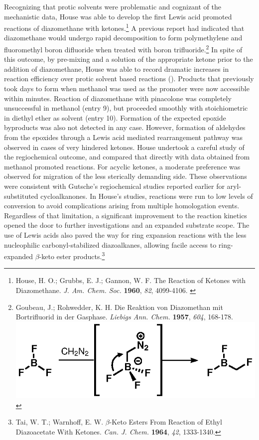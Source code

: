 Recognizing that protic solvents were problematic and cognizant of the mechanistic data, House was
able to develop the first Lewis acid promoted reactions of diazomethane with
ketones.\footnote{{\frenchspacing House, H. O.; Grubbs, E. J.; Gannon, W. F. The Reaction of Ketones
with Diazomethane. \textit{J. Am. Chem. Soc.} \textbf{1960}, \textit{82}, 4099-4106.}
\label{ref:house}} A previous report had indicated that diazomethane would undergo rapid
decomposition to form polymethylene and fluoromethyl boron difluoride when treated with boron trifluoride.\footnote{{\frenchspacing Goubeau,
J.; Rohwedder, K. H. Die Reaktion von Diazomethan mit Bortrifluorid in der Gasphase. \textit{Liebigs Ann. Chem.} \textbf{1957}, \textit{604},
168-178.} \\ \includegraphics[scale=0.7]{chp_diazobkg/images/rohwedder}} In spite of this outcome,
by pre-mixing  and a solution of the appropriate ketone prior to the addition of
diazomethane, House was able to record dramatic increases in reaction efficiency over protic
solvent based reactions (). Products that previously took days to form when
methanol was used as the promoter were now accessible within minutes. Reaction of diazomethane with
pinacolone was completely unsuccessful in methanol (entry 9), but proceeded smoothly with
stoichiometric  in diethyl ether as solvent (entry 10).
Formation of the expected epoxide byproducts was also not detected in any case. However, formation
of aldehydes from the epoxides through a Lewis acid mediated rearrangement pathway was observed in cases of very hindered ketones. House undertook a careful study of the regiochemical
outcome, and compared that directly with data obtained from methanol promoted reactions.
For acyclic ketones, a moderate preference was observed for migration of the less sterically
demanding side. These observations were consistent with Gutsche's regiochemical studies reported
earlier for aryl-substituted cycloalkanones. In House's studies, reactions
were run to low levels of conversion to avoid complications arising from multiple homologation
events. Regardless of that limitation, a significant improvement to the reaction kinetics opened the
door to further investigations and an expanded substrate scope. The use of Lewis acids also paved
the way for ring expansion reactions with the less nucleophilic carbonyl-stabilized diazoalkanes,
allowing facile access to ring-expanded $\beta$-keto ester products.\footnote{{\frenchspacing Tai,
W. T.; Warnhoff, E. W. $\beta$-Keto Esters From Reaction of Ethyl Diazoacetate With Ketones.
\textit{Can. J. Chem.} \textbf{1964}, \textit{42}, 1333-1340.}}


